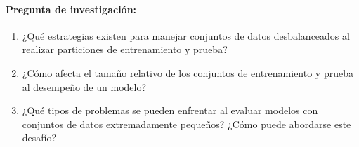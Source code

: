 \documentclass[a4,11pt]{aleph-notas}
\begin{document}
\paragraph{Pregunta de investigación:} 
\begin{enumerate}
    \item ¿Qué estrategias existen para manejar conjuntos de datos desbalanceados al realizar particiones de entrenamiento y prueba?
    \item ¿Cómo afecta el tamaño relativo de los conjuntos de entrenamiento y prueba al desempeño de un modelo?
    \item ¿Qué tipos de problemas se pueden enfrentar al evaluar modelos con conjuntos de datos extremadamente pequeños? ¿Cómo puede abordarse este desafío?
\end{enumerate}
    
\end{document}
